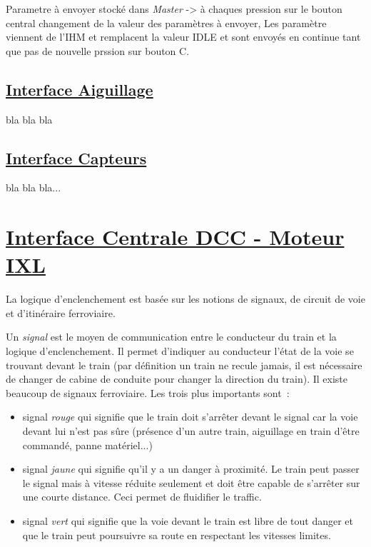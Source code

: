 Parametre à envoyer stocké dans \emph{Master}\hfill\linebreak
-> à chaques pression sur le bouton central changement de la valeur\linebreak
des paramètres à envoyer, Les paramètre viennent de l'IHM et\linebreak
remplacent la valeur IDLE et sont envoyés en continue tant que pas de\linebreak
nouvelle prssion sur bouton C.\linebreak
\bigskip

\subsection{\underline{Interface Aiguillage}}
\label{sec:int_aig}

bla bla bla

\subsection{\underline{Interface Capteurs}}
\label{sec:int_cap}

bla bla bla...


\newpage
\section{\underline{Interface Centrale DCC - Moteur IXL}}
\label{sec:int_ixl}   

La logique d'enclenchement est basée sur les notions de signaux, de circuit de voie et d'itinéraire ferroviaire.

Un \emph{signal} est le moyen de communication entre le conducteur du train et la logique d'enclenchement. 
Il permet d'indiquer au conducteur l'état de la voie se trouvant devant le train (par définition un 
train ne recule jamais, il est nécessaire de changer de cabine de conduite pour changer
la direction du train). Il existe beaucoup de signaux ferroviaire. Les trois plus importants sont~:
\begin{itemize}
\item signal \emph{rouge} qui signifie que le train doit s'arrêter devant le signal car la
voie devant lui n'est pas sûre (présence d'un autre train, aiguillage en train d'être commandé, panne 
matériel...)
\item signal \emph{jaune} qui signifie qu'il y a un danger à proximité. Le train peut passer le signal
mais à vitesse réduite seulement et doit être capable de s'arrêter sur une courte distance. Ceci permet 
de fluidifier le traffic.
\item signal \emph{vert} qui signifie que la voie devant le train est libre de tout danger et que le train 
peut poursuivre sa route en respectant les vitesses limites.
\end{itemize}

